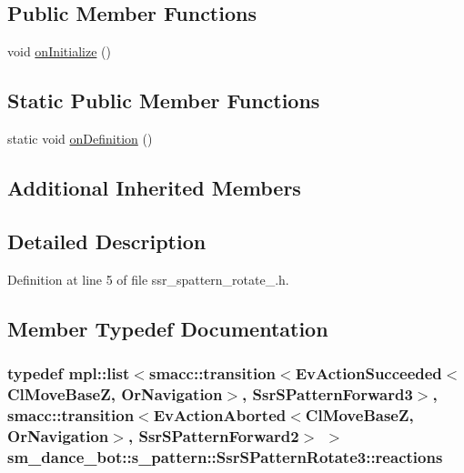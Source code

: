 \subsection*{Public Member Functions}
\begin{DoxyCompactItemize}
\item 
void \hyperlink{structsm__dance__bot_1_1s__pattern_1_1SsrSPatternRotate3_a084448eb0671a55cd11cb9aba99271fb}{on\+Initialize} ()
\end{DoxyCompactItemize}
\subsection*{Static Public Member Functions}
\begin{DoxyCompactItemize}
\item 
static void \hyperlink{structsm__dance__bot_1_1s__pattern_1_1SsrSPatternRotate3_a0c8eb6646cf5cb9651cee750d7cb176f}{on\+Definition} ()
\end{DoxyCompactItemize}
\subsection*{Additional Inherited Members}


\subsection{Detailed Description}


Definition at line 5 of file ssr\+\_\+spattern\+\_\+rotate\+\_.\+h.



\subsection{Member Typedef Documentation}
\subsubsection[{\texorpdfstring{reactions}{reactions}}]{\setlength{\rightskip}{0pt plus 5cm}typedef mpl\+::list$<${\bf smacc\+::transition}$<$Ev\+Action\+Succeeded$<${\bf Cl\+Move\+BaseZ}, {\bf Or\+Navigation}$>$, {\bf Ssr\+S\+Pattern\+Forward3}$>$, {\bf smacc\+::transition}$<$Ev\+Action\+Aborted$<${\bf Cl\+Move\+BaseZ}, {\bf Or\+Navigation}$>$, {\bf Ssr\+S\+Pattern\+Forward2}$>$ $>$ {\bf sm\+\_\+dance\+\_\+bot\+::s\+\_\+pattern\+::\+Ssr\+S\+Pattern\+Rotate3\+::reactions}}\hypertarget{structsm__dance__bot_1_1s__pattern_1_1SsrSPatternRotate3_adfa0a5717a6bd1f595ebaef94265741d}{}\label{structsm__dance__bot_1_1s__pattern_1_1SsrSPatternRotate3_adfa0a5717a6bd1f595ebaef94265741d}


